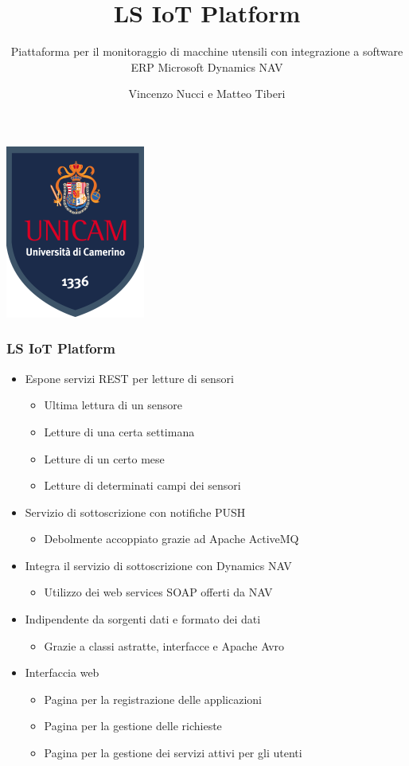 \documentclass{beamer}
\title{LS IoT Platform}
\subtitle{Piattaforma per il monitoraggio di macchine utensili con integrazione a software ERP Microsoft Dynamics NAV}
\author{Vincenzo Nucci e Matteo Tiberi}
\institute{Università di Camerino}
\date{}
\begin{document}
	
	\begin{frame}
	\centering
	\includegraphics[scale=0.7]{images/stemma.png}\par
\end{frame}


\begin{frame}
\frametitle{LS IoT Platform}
\begin{itemize}
	\item Espone servizi REST per letture di sensori
	\begin{itemize}
		\item Ultima lettura di un sensore
		\item Letture di una certa settimana
		\item Letture di un certo mese
		\item Letture di determinati campi dei sensori
	\end{itemize}
	\item Servizio di sottoscrizione con notifiche PUSH
	\begin{itemize}
		\item Debolmente accoppiato grazie ad Apache ActiveMQ
	\end{itemize}
	\item Integra il servizio di sottoscrizione con Dynamics NAV
	\begin{itemize}
		\item Utilizzo dei web services SOAP offerti da NAV
	\end{itemize}
	\item Indipendente da sorgenti dati e formato dei dati
	\begin{itemize}
		\item Grazie a classi astratte, interfacce e Apache Avro
	\end{itemize}
	\item Interfaccia web
	\begin{itemize}
		\item Pagina per la registrazione delle applicazioni
		\item Pagina per la gestione delle richieste
		\item Pagina per la gestione dei servizi attivi per gli utenti
	\end{itemize}
\end{itemize}
\end{frame}
\end{document}
